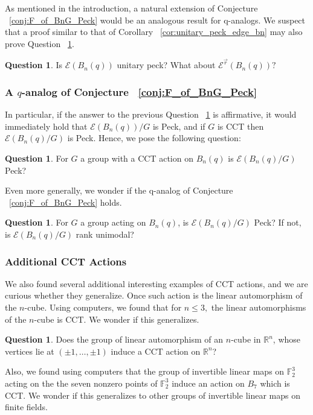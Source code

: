 \documentclass[10 pt]{amsart}
\theoremstyle{plain}
\theoremstyle{definition}
\newtheorem{question}[thm]{Question}
\theoremstyle{remark}
\numberwithin{equation}{section}
\newcommand\sssec{\subsubsection}
\newcommand\BF{{\mathbb F}}
\newcommand\BR{{\mathbb R}}
\renewcommand{\vec}[1]{\overrightarrow{#1}}
\begin{document}
As mentioned in the introduction, a natural extension of Conjecture ~\ref{conj:F_of_BnG_Peck} would be an analogous result for q-analogs. We suspect that a proof similar to that of Corollary ~\ref{cor:unitary_peck_edge_bn} may also prove Question ~\ref{question:unitary_peck_q_edge}.

\begin{question}
\label{question:unitary_peck_q_edge}
Is $\mathcal E(B_n(q))$ unitary peck? What about $\mathcal E^{\vec r}(B_n(q))?$
\end{question}

\sssec{A $q$-analog of Conjecture ~\ref{conj:F_of_BnG_Peck}}

In particular, if the answer to the previous Question ~\ref{question:unitary_peck_q_edge} is affirmative, it would immediately hold that $\mathcal E(B_n(q))/G$ is Peck, and if $G$ is CCT then $\mathcal E(B_n(q)/G)$ is Peck. Hence, we pose the following question: 

\begin{question}
For $G$ a group with a CCT action on $B_n(q)$ is $\mathcal E(B_n(q)/G)$ Peck?
\end{question}

Even more generally, we wonder if the q-analog of Conjecture ~\ref{conj:F_of_BnG_Peck} holds.

\begin{question}
For $G$ a group acting on $B_n(q)$, is $\mathcal E(B_n(q)/G)$ Peck? If not, is $\mathcal E(B_n(q)/G)$ rank unimodal?
\end{question}

\sssec{Additional CCT Actions}

We also found several additional interesting examples of CCT actions, and we are curious whether they generalize. Once such action is the linear automorphism of the $n$-cube. Using computers, we found that for $n \leq 3,$ the linear automorphisms of the $n$-cube is CCT. We wonder if this generalizes.

\begin{question}
Does the group of linear automorphism of an $n$-cube in $\BR^n$, whose vertices lie at $(\pm 1, \ldots, \pm 1)$ induce a CCT action on $\BR^n$?
\end{question}

Also, we found using computers that the group of invertible linear maps on $\BF_2^3$ acting on the the seven nonzero points of $\BF_2^3$ induce an action on $B_7$ which is CCT. We wonder if this generalizes to other groups of invertible linear maps on finite fields.
\end{document}
